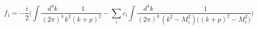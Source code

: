 \begin{equation}\label{F1}
f_1 =
- \frac{i}{2}\Bigg(\int\frac{d^4k}{(2\pi)^4} \frac{1}{k^2 (k+p)^2}
- \sum\limits_i c_i \int\frac{d^4k}{(2\pi)^4}
\frac{1}{(k^2-M_i^2)\Big((k+p)^2-M_i^2\Big)}\Bigg)
\end{equation}

